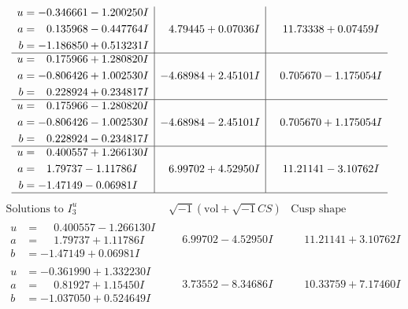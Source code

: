 \documentclass[1p]{elsarticle_modified}
\theoremstyle{definition}
\newcommand{\I}{\sqrt{-1}}
\begin{document}
$$\begin{array}{c|c|c}
\begin{aligned}
u &= -0.346661 - 1.200250 I \\
a &= \phantom{-}0.135968 - 0.447764 I \\
b &= -1.186850 + 0.513231 I\end{aligned}
 & \phantom{-}4.79445 + 0.07036 I & \phantom{-}11.73338 + 0.07459 I \\ \hline\begin{aligned}
u &= \phantom{-}0.175966 + 1.280820 I \\
a &= -0.806426 + 1.002530 I \\
b &= \phantom{-}0.228924 + 0.234817 I\end{aligned}
 & -4.68984 + 2.45101 I & \phantom{-}0.705670 - 1.175054 I \\ \hline\begin{aligned}
u &= \phantom{-}0.175966 - 1.280820 I \\
a &= -0.806426 - 1.002530 I \\
b &= \phantom{-}0.228924 - 0.234817 I\end{aligned}
 & -4.68984 - 2.45101 I & \phantom{-}0.705670 + 1.175054 I \\ \hline\begin{aligned}
u &= \phantom{-}0.400557 + 1.266130 I \\
a &= \phantom{-}1.79737 - 1.11786 I \\
b &= -1.47149 - 0.06981 I\end{aligned}
 & \phantom{-}6.99702 + 4.52950 I & \phantom{-}11.21141 - 3.10762 I\\
 \hline 
 \end{array}$$\newpage$$\begin{array}{c|c|c}  
\text{Solutions to }I^u_{3}& \I (\text{vol} + \sqrt{-1}CS) & \text{Cusp shape}\\
 \hline 
\begin{aligned}
u &= \phantom{-}0.400557 - 1.266130 I \\
a &= \phantom{-}1.79737 + 1.11786 I \\
b &= -1.47149 + 0.06981 I\end{aligned}
 & \phantom{-}6.99702 - 4.52950 I & \phantom{-}11.21141 + 3.10762 I \\ \hline\begin{aligned}
u &= -0.361990 + 1.332230 I \\
a &= \phantom{-}0.81927 + 1.15450 I \\
b &= -1.037050 + 0.524649 I\end{aligned}
 & \phantom{-}3.73552 - 8.34686 I & \phantom{-}10.33759 + 7.17460 I \\ \hline\begin{aligned}

\end{aligned}
\end{array}$$
\end{document}
